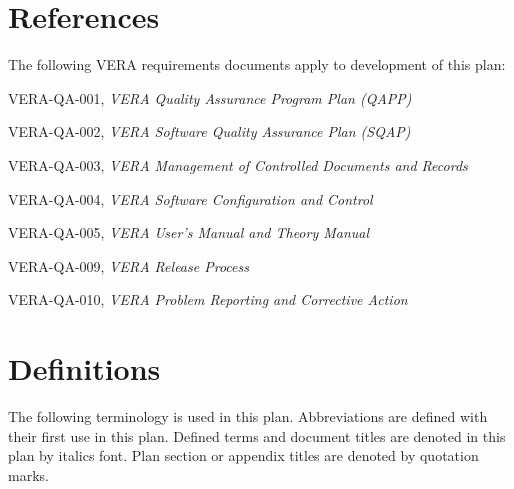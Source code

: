\documentclass{vera-ornltm}
\begin{document}

\section{References}

The following VERA requirements documents apply to development of this plan:

\begin{description}
\item VERA-QA-001, {\it VERA Quality Assurance Program Plan (QAPP)}
\item VERA-QA-002, {\it VERA Software Quality Assurance Plan (SQAP)}
\item VERA-QA-003, {\it VERA Management of Controlled Documents and Records}
\item VERA-QA-004, {\it VERA Software Configuration and Control}
\item VERA-QA-005, {\it VERA User's Manual and Theory Manual}
\item{\VERAReq}
\item VERA-QA-009, {\it VERA Release Process}
\item VERA-QA-010, {\it VERA Problem Reporting and Corrective Action}
\end{description}



\section{Definitions}

The following terminology is used in this plan.
Abbreviations are defined with their first use in this plan.
Defined terms and document titles are denoted in this plan by italics font.
Plan section or appendix titles are denoted by quotation marks.
\end{document}
